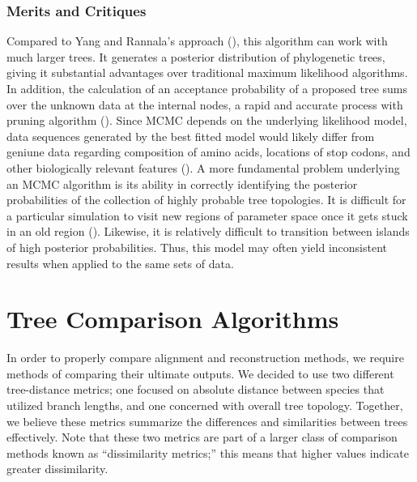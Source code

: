 \documentclass[10pt,twocolumn]{article}
\begin{document}
\subsubsection*{Merits and Critiques}
Compared to Yang and Rannala's approach (\cite{yang1997bayesian}), this algorithm can work with much larger trees. It generates a posterior distribution of phylogenetic trees, giving it substantial advantages over traditional maximum likelihood algorithms. In addition, the calculation of an acceptance probability of a proposed tree sums over the unknown data at the internal nodes, a rapid and accurate process with pruning algorithm (\cite{felsenstein1983statistical}).
Since MCMC depends on the underlying likelihood model, data sequences generated by the best fitted model would likely differ from geniune data regarding composition of amino acids, locations of stop codons, and other biologically relevant features (\cite{larget1999markov}).
A more fundamental problem underlying an MCMC algorithm is its ability in correctly identifying the posterior probabilities of the collection of highly probable tree topologies. It is difficult for a particular simulation to visit new regions of parameter space once it gets stuck in an old region (\cite{larget1999markov}). Likewise, it is relatively difficult to transition between islands of high posterior probabilities. Thus, this model may often yield inconsistent results when applied to the same sets of data.


\section*{Tree Comparison Algorithms}
In order to properly compare alignment and reconstruction methods, we require methods of comparing their ultimate outputs. We decided to use two different tree-distance metrics; one focused on absolute distance between species that utilized branch lengths, and one concerned with overall tree topology. Together, we believe these metrics summarize the differences and similarities between trees effectively. Note that these two metrics are part of a larger class of comparison methods known as ``dissimilarity metrics;'' this means that higher values indicate greater dissimilarity.
\end{document}
